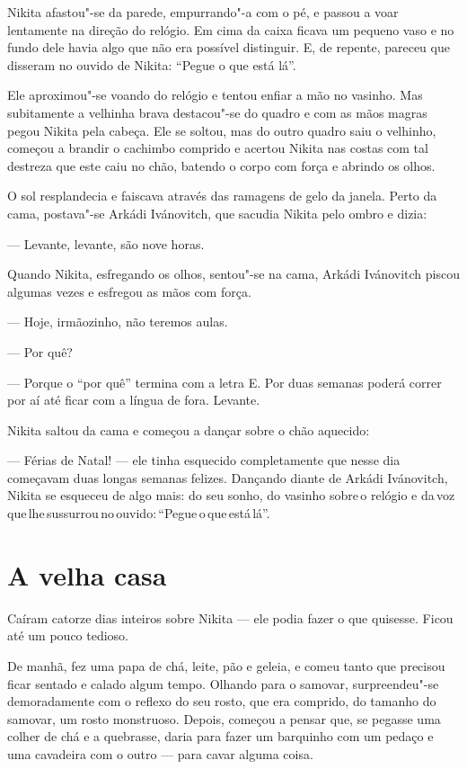 Nikita afastou"-se da parede, empurrando"-a com o pé, e passou a voar
lentamente na direção do relógio. Em cima da caixa ficava um pequeno
vaso e no fundo dele havia algo que não era possível distinguir. E, de
repente, pareceu que disseram no ouvido de Nikita: ``Pegue o que está
lá''.

Ele aproximou"-se voando do relógio e tentou enfiar a mão no vasinho. Mas
subitamente a velhinha brava destacou"-se do quadro e com as mãos magras
pegou Nikita pela cabeça. Ele se soltou, mas do outro quadro saiu o
velhinho, começou a brandir o cachimbo comprido e acertou Nikita nas
costas com tal destreza que este caiu no chão, batendo o corpo com força
e abrindo os olhos.

O sol resplandecia e faiscava através das ramagens de gelo da janela.
Perto da cama, postava"-se Arkádi Ivánovitch, que sacudia Nikita pelo
ombro e dizia:

--- Levante, levante, são nove horas.

Quando Nikita, esfregando os olhos, sentou"-se na cama, Arkádi Ivánovitch
piscou algumas vezes e esfregou as mãos com força.

--- Hoje, irmãozinho, não teremos aulas.

--- Por quê?

--- Porque o ``por quê'' termina com a letra E. Por duas semanas poderá
correr por aí até ficar com a língua de fora. Levante.

Nikita saltou da cama e começou a dançar sobre o chão aquecido:

--- Férias de Natal! --- ele tinha esquecido completamente que nesse dia 
começavam duas longas semanas felizes. Dançando diante de Arkádi
Ivánovitch, Nikita se esqueceu de algo mais: do seu sonho, do vasinho
sobre\,o relógio e da\,voz\,que\,lhe\,sussurrou\,no\,ouvido:\,``Pegue\,o\,que\,está\,lá''.

\chapter{A velha casa}

Caíram catorze dias inteiros sobre Nikita --- ele podia fazer o que
quisesse. Ficou até um pouco tedioso.

De manhã, fez uma papa de chá, leite, pão e geleia, e comeu tanto que
precisou ficar sentado e calado algum tempo. Olhando para o samovar,
surpreendeu"-se demoradamente com o reflexo do seu rosto, que era
comprido, do tamanho do samovar, um rosto monstruoso. Depois, começou a
pensar que, se pegasse uma colher de chá e a quebrasse, daria para fazer
um barquinho com um pedaço e uma cavadeira com o outro --- para cavar
alguma coisa.

